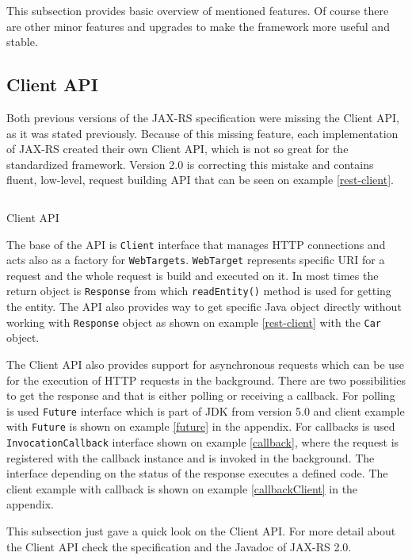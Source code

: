 \documentclass[12pt,final,oneside]{fithesis2}
\begin{document}
This subsection provides basic overview of mentioned features. Of course there are other minor features and upgrades to make the framework more useful and stable.

\subsection*{Client API}\label{client-api}
Both previous versions of the JAX-RS specification were missing the Client API, as it was stated previously. Because of this missing feature, each implementation of JAX-RS created their own Client API, which is not so great for the standardized framework. Version 2.0 is correcting this mistake and contains fluent, low-level, request building API that can be seen on example \ref{rest-client}. 

\begin{listing}[ht]
	\inputminted[]{java}{sources/client.java}
	\caption{Client API}
	\label{rest-client}
\end{listing}

The base of the API is \texttt{Client} interface that manages HTTP connections and acts also as a factory for \texttt{WebTargets}. \texttt{WebTarget} represents specific URI for a request and the whole request is build and executed on it. In most times the return object is \texttt{Response} from which \texttt{readEntity()} method is used for getting the entity. The API also provides way to get specific Java object directly without working with \texttt{Response} object as shown on example \ref{rest-client} with the \texttt{Car} object.

The Client API also provides support for asynchronous requests which can be use for the execution of HTTP requests in the background. There are two possibilities to get the response and that is either polling or receiving a callback. For polling is used \texttt{Future} interface which is part of JDK from version 5.0 and client example with \texttt{Future} is shown on example \ref{future} in the appendix. For callbacks is used \texttt{InvocationCallback} interface shown on example \ref{callback}, where the request is registered with the callback instance and is invoked in the background. The interface depending on the status of the response executes a defined code\cite{jax-rs-2.0-new}\cite{jax-rs-2.0}. The client example with callback is shown on example \ref{callbackClient} in  the appendix.

This subsection just gave a quick look on the Client API. For more detail about the Client API check the specification and the Javadoc of JAX-RS 2.0.
\end{document}
